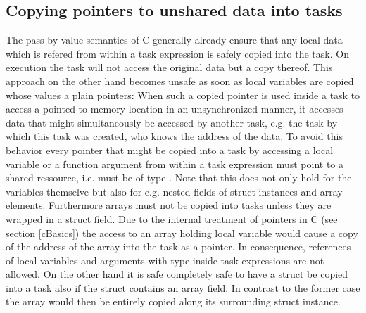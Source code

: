 \subsection{Copying pointers to unshared data into tasks}
The pass-by-value semantics of C generally already ensure that any local data which is refered from within a task expression is safely copied into the task. On execution the task will not access the original data but a copy thereof. This approach on the other hand becomes unsafe as soon as local variables are copied whose values a plain pointers: When such a copied pointer is used inside a task to access a pointed-to memory location in an unsynchronized manner, it accesses data that might simultaneously be accessed by another task, e.g. the task by which this task was created, who knows the address of the data. To avoid this behavior every pointer that might be copied into a task by accessing a local variable or a function argument from within a task expression must point to a shared ressource, i.e. must be of type . Note that this does not only hold for the variables themselve but also for e.g. nested fields of struct instances and array elements. Furthermore arrays must not be copied into tasks unless they are wrapped in a struct field. Due to the internal treatment of pointers in C (see section \ref{cBasics}) the access to an array holding local variable would cause a copy of the address of the array into the task as a pointer. In consequence, references of local variables and arguments with type  inside task expressions are not allowed. On the other hand it is safe completely safe to have a struct be copied into a task also if the struct contains an array field. In contrast to the former case the array would then be entirely copied along its surrounding struct instance.

